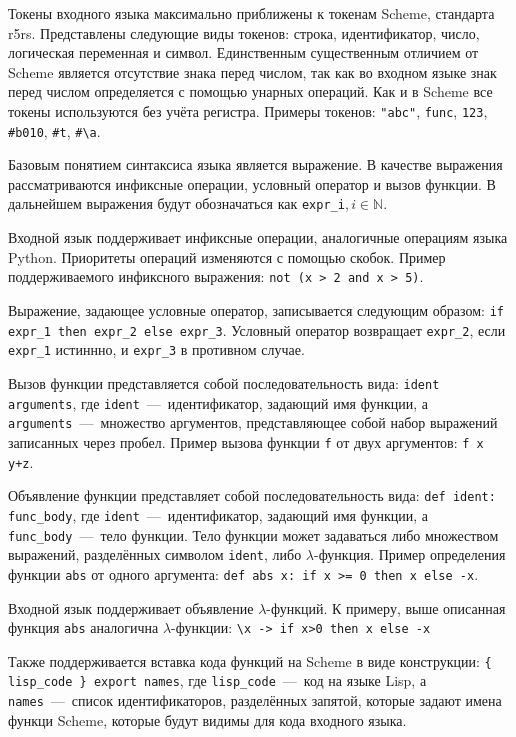 \documentclass[12pt,a4paper,oneside]{extarticle}
\begin{document}
    Токены входного языка максимально приближены к токенам Scheme, стандарта r5rs.
    Представлены следующие виды токенов: строка, идентификатор, число, логическая переменная и символ.
    Единственным существенным отличием от Scheme является отсутствие знака перед числом, так как во входном языке знак перед числом определяется с помощью унарных операций.
    Как и в Scheme все токены используются без учёта регистра.
    Примеры токенов: \lstinline$"abc"$, \lstinline$func$, \lstinline$123$, \lstinline$#b010$, \lstinline$#t$, \lstinline$#\a$.

    Базовым понятием синтаксиса языка является выражение.
    В качестве выражения рассматриваются инфиксные операции, условный оператор и вызов функции.
    В дальнейшем выражения будут обозначаться как \lstinline$expr_i$$,i \in \mathbb{N}$.

    Входной язык поддерживает инфиксные операции, аналогичные операциям языка Python.
    Приоритеты операций изменяются с помощью скобок.
    Пример поддерживаемого инфиксного выражения: \lstinline$not (x > 2 and x > 5)$.

    Выражение, задающее условные оператор, записывается следующим образом: \lstinline$if expr_1 then expr_2 else expr_3$.
    Условный оператор возвращает \lstinline$expr_2$, если \lstinline$expr_1$ истиннно, и \lstinline$expr_3$ в противном случае.

    Вызов функции представляется собой последовательность вида: \lstinline$ident arguments$, где \lstinline$ident$~---~идентификатор, задающий имя функции, а \lstinline$arguments$~---~множество аргументов, представляющее собой набор выражений записанных через пробел.
    Пример вызова функции \lstinline$f$ от двух аргументов: \lstinline$f x y+z$.

    Объявление функции представляет собой последовательность вида: \lstinline$def ident: func_body$, где \lstinline$ident$~---~идентификатор, задающий имя функции, а \lstinline$func_body$~---~тело функции.
    Тело функции может задаваться либо множеством выражений, разделённых символом \lstinline$ident$, либо $\lambda$-функция. Пример определения функции \lstinline$abs$ от одного аргумента: \lstinline$def abs x: if x >= 0 then x else -x$.

    Входной язык поддерживает объявление $\lambda$-функций. К примеру, выше описанная функция \lstinline$abs$ аналогична $\lambda$-функции: \lstinline$\x -> if x>0 then x else -x$

    Также поддерживается вставка кода функций на Scheme в виде конструкции: \lstinline${ lisp_code } export names$, где \lstinline$lisp_code$~---~код на языке Lisp, а \lstinline$names$~---~список идентификаторов, разделённых запятой, которые задают имена функци Scheme, которые будут видимы для кода входного языка.
\end{document}
